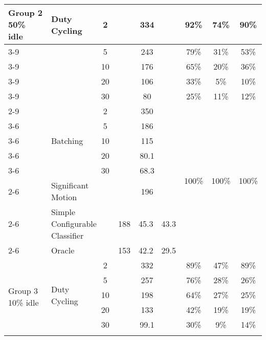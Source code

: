 \begin{table*}
{\begin{tabular}{|l|l|c|c|c|c|c|c|c|}
	\multirow{14}{*}{\parbox{1.2cm}{Group 2 50\% idle}}
								& \multirow{5}{*}{Duty Cycling}	& 2						& \multicolumn{3}{c|}{334}				& 92\%					& 74\%						& 90\%						\\ \cline{3-9}
								& 								& 5						& \multicolumn{3}{c|}{243}				& 79\%					& 31\%						& 53\%						\\ \cline{3-9}
								& 								& 10					& \multicolumn{3}{c|}{176}				& 65\%					& 20\%						& 36\%						\\ \cline{3-9}
								& 								& 20					& \multicolumn{3}{c|}{106}				& 33\%					& 5\%						& 10\%						\\ \cline{3-9}
								& 								& 30					& \multicolumn{3}{c|}{80}				& 25\%					& 11\%						& 12\%						\\ \cline{2-9}
								
								& \multirow{5}{*}{Batching}		& 2						& \multicolumn{3}{c|}{350}				& \multirow{8}{*}{100\%}& \multirow{8}{*}{100\%}	& \multirow{8}{*}{100\%}	\\ \cline{3-6}
								& 								& 5						& \multicolumn{3}{c|}{186}				&						&							&							\\ \cline{3-6}
								& 								& 10					& \multicolumn{3}{c|}{115}				&						&							&							\\ \cline{3-6}
								& 								& 20					& \multicolumn{3}{c|}{80.1}				&						&							&							\\ \cline{3-6}
								& 								& 30					& \multicolumn{3}{c|}{68.3}				&						&							&							\\ \cline{2-6}
								
								& \multicolumn{2}{l|}{Significant Motion}				& \multicolumn{3}{c|}{196}				& 						& 							& 							\\ \cline{2-6}
								& \multicolumn{2}{l|}{Simple Configurable Classifier}	& 188		& 45.3		& 43.3			& 						& 							& 							\\ \cline{2-6}
								& \multicolumn{2}{l|}{Oracle}							& 153		& 42.2		& 29.5			& 						& 							& 							\\ \hline \hline

	\multirow{14}{*}{\parbox{1.2cm}{Group 3 10\% idle}}
								& \multirow{5}{*}{Duty Cycling}	& 2						& \multicolumn{3}{c|}{332}				& 89\%					& 47\%						& 89\%						\\ \cline{3-9}
								& 								& 5						& \multicolumn{3}{c|}{257}				& 76\%					& 28\%						& 26\%						\\ \cline{3-9}
								& 								& 10					& \multicolumn{3}{c|}{198}				& 64\%					& 27\%						& 25\%						\\ \cline{3-9}
								& 								& 20					& \multicolumn{3}{c|}{133}				& 42\%					& 19\%						& 19\%						\\ \cline{3-9}
								& 								& 30					& \multicolumn{3}{c|}{99.1}				& 30\%					& 9\%						& 14\%						\\ \cline{2-9}
								

\end{tabular}}
\end{table*}
